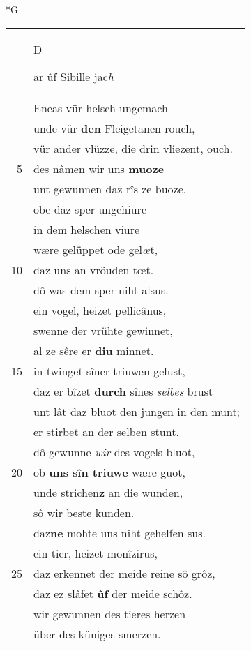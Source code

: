 \documentclass[8pt,a4paper,notitlepage]{article}
\begin{document}
\newpage
\begin{table}[ht]
\begin{minipage}[t]{0.5\linewidth}
\small
\begin{center}*G
\end{center}
\begin{tabular}{rl}
 & \begin{large}D\end{large}ar ûf Sibille jac\textit{h}\\ 
 & Eneas vür helsch ungemach\\ 
 & unde vür \textbf{den} Fleigetanen rouch,\\ 
 & vür ander vlüzze, die drin vliezent, ouch.\\ 
5 & des nâmen wir uns \textbf{muoze}\\ 
 & unt gewunnen daz rîs ze buoze,\\ 
 & obe daz sper ungehiure\\ 
 & in dem helschen viure\\ 
 & wære gelüppet ode gel\textit{œ}t,\\ 
10 & daz uns an vröuden tœt.\\ 
 & dô was dem sper niht alsus.\\ 
 & ein vogel, heizet pellicânus,\\ 
 & swenne der vrühte gewinnet,\\ 
 & al ze sêre er \textbf{diu} minnet.\\ 
15 & in twinget sîner triuwen gelust,\\ 
 & daz er bîzet \textbf{durch} sînes \textit{selbes} brust\\ 
 & unt lât daz bluot den jungen in den munt;\\ 
 & er stirbet an der selben stunt.\\ 
 & dô gewunne \textit{wir} des vogels bluot,\\ 
20 & ob \textbf{uns sîn triuwe} wære guot,\\ 
 & unde strichen\textbf{z} an die wunden,\\ 
 & sô wir beste kunden.\\ 
 & daz\textbf{ne} mohte uns niht gehelfen sus.\\ 
 & ein tier, heizet monîzirus,\\ 
25 & daz erkennet der meide reine sô grôz,\\ 
 & daz ez slâfet \textbf{ûf} der meide schôz.\\ 
 & wir gewunnen des tieres herzen\\ 
 & über des küniges smerzen.\\ 

\end{tabular}
\end{minipage}
\end{table}
\end{document}
